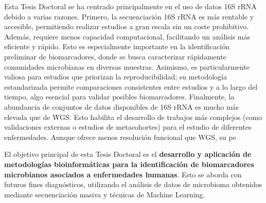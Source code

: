 
Esta Tesis Doctoral se ha centrado principalmente en el uso de datos 16S rRNA debido a varias razones. Primero, la secuenciación 16S rRNA es más rentable y accesible, permitiendo realizar estudios a gran escala sin un coste prohibitivo. Además, requiere menos capacidad computacional, facilitando un análisis más eficiente y rápido. Esto es especialmente importante en la identificación preliminar de biomarcadores, donde se busca caracterizar rápidamente comunidades microbianas en diversas muestras. Asimismo, es particularmente valiosa para estudios que priorizan la reproducibilidad; su metodología estandarizada permite comparaciones consistentes entre estudios y a lo largo del tiempo, algo esencial para validar posibles biomarcadores. Finalmente, la abundancia de conjuntos de datos disponibles de 16S rRNA es mucho más elevada que de WGS. Esto habilita el desarrollo de trabajos más complejos (como validaciones externas o estudios de metacohortes) para el estudio de diferentes enfermedades. Aunque ofrece menos resolución funcional que WGS, su pe






El objetivo principal de esta Tesis Doctoral es el \textbf{desarrollo y aplicación de metodologías bioinformáticas para la identificación de biomarcadores microbianos asociados a enfermedades humanas}. Esto se aborda con futuros fines diagnósticos, utilizando el análisis de datos de microbioma obtenidos mediante secuenciación masiva y técnicas de Machine Learning.



